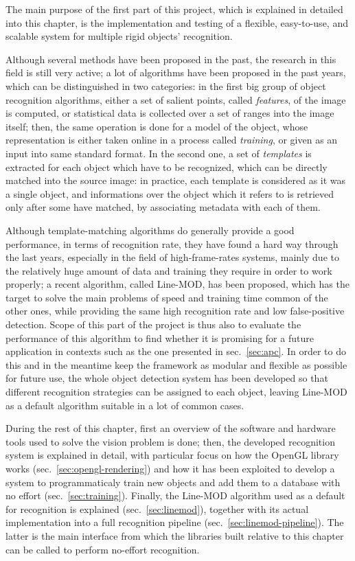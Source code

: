 The main purpose of the first part of this project, which is explained
in detailed into this chapter, is the implementation and testing of a
flexible, easy-to-use, and scalable system for multiple rigid objects' recognition.

Although several methods have been proposed in the past, the research
in this field is still very active; a lot of algorithms have been
proposed in the past years, which can be distinguished in two
categories: in the first big group of object recognition algorithms,
either a set of salient points, called \emph{features}, of the image is
computed, or statistical data is collected over a set of ranges into
the image itself; then, the same operation is done for a model of the
object, whose representation is either taken online in a process
called \emph{training}, or given as an input into same standard
format. In the second one, a set of \emph{templates} is extracted for
each object which have to be recognized, which can be directly matched
into the source image: in practice, each template is considered as it
was a single object, and informations over the object which it refers
to is retrieved only after some have matched, by associating metadata
with each of them.

Although template-matching algorithms do generally provide a good
performance, in terms of recognition rate, they have found a hard way through
the last years, especially in the field of high-frame-rates systems,
mainly due to the relatively huge amount of data and training they require in
order to work properly; a recent algorithm, called Line-MOD, has been
proposed, which has the target to solve the main problems of speed and
training time common of the other ones, while providing the same high
recognition rate and low false-positive detection. Scope of this part
of the project is thus also to evaluate the performance of this
algorithm to find whether it is promising for a future application in contexts such as
the one presented in sec.~\ref{sec:apc}. In order to do this and in
the meantime keep the framework as modular and flexible as possible
for future use, the  whole object detection system has been developed
so that different recognition strategies can be assigned to each
object, leaving Line-MOD as a default algorithm suitable in a lot of
common cases.

During the rest of this chapter, first an overview of the software and
hardware tools used to solve the vision problem is done; then, the
developed recognition system is explained in detail, with particular
focus on how the OpenGL library works
(sec.~\ref{sec:opengl-rendering}) and how it has been exploited to
develop a system to programmaticaly train new objects and add them to
a database with no effort (sec.~\ref{sec:training}). Finally, the
Line-MOD algorithm used as a default for recognition is explained
(sec.~\ref{sec:linemod}), together with its actual implementation into
a full recognition pipeline (sec.~\ref{sec:linemod-pipeline}). The
latter is the main interface from which the libraries built relative
to this chapter can be called to perform no-effort recognition.

